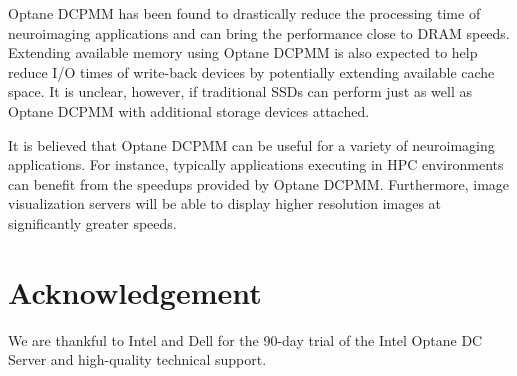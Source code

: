 \documentclass[conference]{IEEEtran}
\begin{document}
Optane DCPMM has been found to drastically reduce the processing time of neuroimaging applications and
can bring the performance close to DRAM speeds. Extending available memory using Optane DCPMM is also 
expected to help reduce I/O times of write-back devices by potentially extending available cache space.
It is unclear, however, if traditional SSDs can perform just as well as Optane DCPMM with additional storage devices
attached.

It is believed that Optane DCPMM can be useful for a variety of neuroimaging applications. For
instance, typically applications executing in HPC environments can benefit from 
the speedups provided by Optane DCPMM. Furthermore, image visualization servers will be able
to display higher resolution images at significantly greater speeds.
\section{Acknowledgement}
We are thankful to Intel and Dell
for the 90-day trial of the Intel Optane DC Server and high-quality technical support.
 

\end{document}
